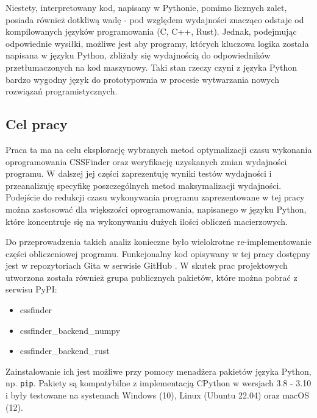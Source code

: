 \documentclass[10pt, a4paper]{article}
\newcommand{\code}[1]{\texttt{#1}}
\begin{document}
\begin{sloppypar}
    Niestety, interpretowany kod, napisany w Pythonie, pomimo licznych zalet, posiada
    również dotkliwą wadę - pod względem wydajności znacząco odstaje od kompilowanych
    języków programowania (C\cite{C_vs_Python}, C++\cite{Cpp_vs_Python}, Rust\cite{Rust_vs_Python}).
    Jednak, podejmując odpowiednie wysiłki, możliwe jest aby programy, których kluczowa logika
    została napisana w języku Python, zbliżały się wydajnością do odpowiedników
    przetłumaczonych na kod maszynowy. Taki stan rzeczy czyni z języka Python bardzo wygodny
    język do prototypownia w procesie wytwarzania nowych rozwiązań programistycznych.

    \subsection{Cel pracy}


    Praca ta ma na celu eksplorację wybranych metod optymalizacji czasu wykonania oprogramowania
    CSSFinder oraz weryfikację uzyskanych zmian wydajności programu. W dalszej jej
    części zaprezentuję wyniki testów wydajności i przeanalizuję specyfikę
    poszczególnych metod maksymalizacji wydajności. Podejście do redukcji czasu wykonywania
    programu zaprezentowane w tej pracy można zastosować dla większości oprogramowania,
    napisanego w języku Python, które koncentruje się na wykonywaniu dużych ilości obliczeń
    macierzowych.

    Do przeprowadzenia takich analiz konieczne było wielokrotne re-implementowanie części
    obliczeniowej programu. Funkcjonalny kod opisywany w tej pracy dostępny jest w
    repozytoriach Gita\cite{Git_Com} w serwisie GitHub \cite{CSSFinder_New}\cite{CSSFinder_New_Numpy}\cite{CSSFinder_New_Rust}.
    W skutek prac projektowych utworzona została również grupa publicznych pakietów, które
    można pobrać z serwisu PyPI:

    \begin{itemize}
      \item cssfinder\cite{CSSFinder_New_PyPI}

      \item cssfinder\_backend\_numpy\cite{CSSFinder_New_Numpy_PyPI}

      \item cssfinder\_backend\_rust\cite{CSSFinder_New_Rust_PyPI}
    \end{itemize}

    Zainstalowanie ich jest możliwe przy pomocy menadżera pakietów języka Python, np.
    \code{pip}\cite{PIP}. Pakiety są kompatybilne z implementacją CPython w wersjach 3.8
    - 3.10 i były testowane na systemach Windows (10), Linux (Ubuntu 22.04) oraz macOS (12).


\end{sloppypar}
\end{document}
